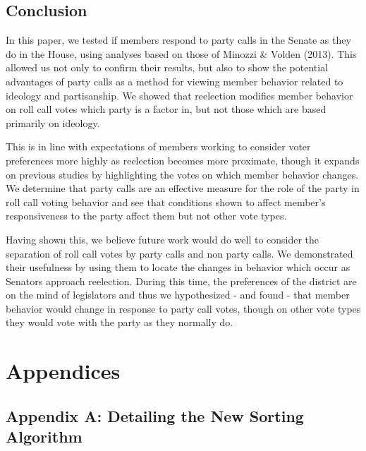 \documentclass[12pt]{article}
\begin{document}
\subsection{Conclusion}

In this paper, we tested if members respond to party calls in the Senate as they do in the House, using analyses based on those of Minozzi \& Volden (2013). This allowed us not only to confirm their results, but also to show the potential advantages of party calls as a method for viewing member behavior related to ideology and partisanship. We showed that reelection modifies member behavior on roll call votes which party is a factor in, but not those which are based primarily on ideology. 

This is in line with expectations of members working to consider voter preferences more highly as reelection becomes more proximate, though it expands on previous studies by highlighting the votes on which member behavior changes. We determine that party calls are an effective measure for the role of the party in roll call voting behavior and see that conditions shown to affect member's responsiveness to the party affect them but not other vote types.

Having shown this, we believe future work would do well to consider the separation of roll call votes by party calls and non party calls. We demonstrated their usefulness by using them to locate the changes in behavior which occur as Senators approach reelection. During this time, the preferences of the district are on the mind of legislators and thus we hypothesized - and found - that member behavior would change in response to party call votes, though on other vote types they would vote with the party as they normally do.

\pagebreak

\section{Appendices}

\subsection{Appendix A: Detailing the New Sorting Algorithm}
\end{document}
